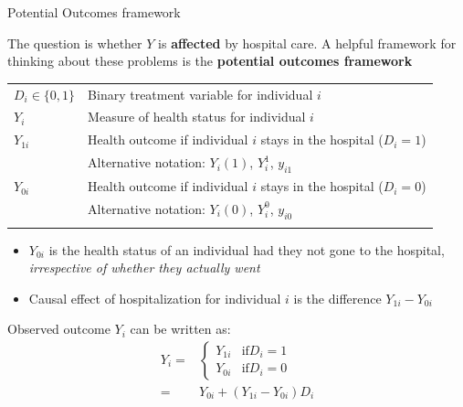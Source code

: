 \documentclass[handout, 8pt]{beamer}
\begin{document}
\begin{frame}{Potential Outcomes framework}

The question is whether $Y$ is \textbf{affected} by hospital care. 
A helpful framework for thinking about these problems is the \textbf{potential outcomes framework}
 
\begin{table}
\begin{tabular}{ll}
$D_i \in \{0, 1\}$ &Binary treatment variable for individual $i$ \\ 
$Y_i$ &Measure of health status for individual $i$\\
\pause
$Y_{1i}$ &Health outcome if individual $i$ stays in the hospital ($D_i=1$) \\
&Alternative notation: $Y_i(1)$, $Y_i^1$, $y_{i1}$ \\
$Y_{0i}$ &Health outcome if individual $i$ stays in the hospital ($D_i=0$)  \\
&Alternative notation: $Y_i(0)$, $Y_i^0$, $y_{i0}$ \\\\
\end{tabular}
\end{table}

\begin{itemize}
    \item $Y_{0i}$ is the health status of an individual had they not gone to the hospital, \emph{irrespective of whether they actually went}
    \item Causal effect of hospitalization for individual $i$ is the difference $Y_{1i} - Y_{0i}$
\end{itemize}

\pause
\vspace{2ex}
Observed outcome $Y_i$ can be written as:
\begin{align*}
    Y_i =& \begin{cases}
    Y_{1i} &\text{if} D_i = 1 \\
    Y_{0i} &\text{if} D_i = 0
    \end{cases} \\
    =& Y_{0i} + (Y_{1i} - Y_{0i}) D_i
\end{align*}
\end{frame}
\end{document}
